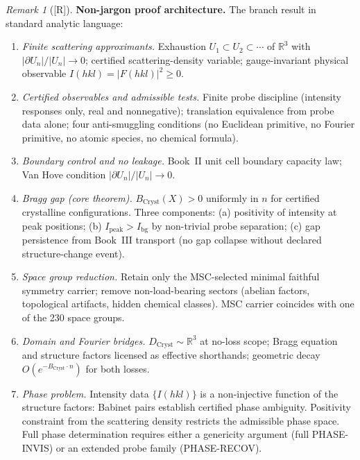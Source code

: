 \documentclass[12pt,oneside]{amsbook}
\theoremstyle{plain}
\theoremstyle{definition}
\theoremstyle{remark}
\newtheorem{remark}[theorem]{Remark}
\newcommand{\status}[1]{\textup{[#1]}}
\begin{document}
\begin{remark}[\status{R}]\label{rem:cryst-nonjargon}
\textbf{Non-jargon proof architecture.}
The branch result in standard analytic language:

\begin{enumerate}[label=\textup{(\arabic*)}]
  \item \emph{Finite scattering approximants.}
    Exhaustion $U_1 \subset U_2 \subset \cdots$ of $\mathbb{R}^3$
    with $|\partial U_n|/|U_n| \to 0$; certified
    scattering-density variable; gauge-invariant physical
    observable $I(hkl) = |F(hkl)|^2 \ge 0$.

  \item \emph{Certified observables and admissible tests.}
    Finite probe discipline (intensity responses only, real and
    nonnegative); translation equivalence from probe data
    alone; four anti-smuggling conditions (no Euclidean
    primitive, no Fourier primitive, no atomic species, no
    chemical formula).

  \item \emph{Boundary control and no leakage.}
    Book~II unit cell boundary capacity law; Van Hove
    condition $|\partial U_n|/|U_n| \to 0$.

  \item \emph{Bragg gap (core theorem).}
    $B_{\mathrm{Cryst}}(X) > 0$ uniformly in $n$ for certified
    crystalline configurations.  Three components: (a) positivity
    of intensity at peak positions; (b) $I_{\mathrm{peak}} >
    I_{\mathrm{bg}}$ by non-trivial probe separation; (c) gap
    persistence from Book~III transport (no gap collapse without
    declared structure-change event).

  \item \emph{Space group reduction.}
    Retain only the MSC-selected minimal faithful symmetry
    carrier; remove non-load-bearing sectors (abelian factors,
    topological artifacts, hidden chemical classes).
    MSC carrier coincides with one of the 230 space groups.

  \item \emph{Domain and Fourier bridges.}
    $D_{\mathrm{Cryst}} \sim \mathbb{R}^3$ at no-loss scope;
    Bragg equation and structure factors licensed as effective
    shorthands; geometric decay
    $O(e^{-B_{\mathrm{Cryst}} \cdot n})$ for both losses.

  \item \emph{Phase problem.}
    Intensity data $\{I(hkl)\}$ is a non-injective function of
    the structure factors: Babinet pairs establish certified
    phase ambiguity.  Positivity constraint from the scattering
    density restricts the admissible phase space.  Full phase
    determination requires either a genericity argument (full
    PHASE-INVIS) or an extended probe family (PHASE-RECOV).


\end{enumerate}
\end{remark}
\end{document}
